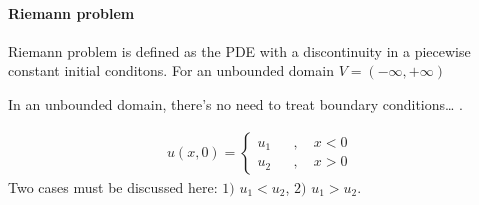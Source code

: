 \documentclass[letterpaper,10pt,english]{jupyterBook}
\begin{document}
\paragraph{Riemann problem}
\label{\detokenize{ch/pde/hyperbolic-1d-scalar-nonlinear:riemann-problem}}\label{\detokenize{ch/pde/hyperbolic-1d-scalar-nonlinear:pde-hyperbolic-problems-scalar-nonlinear-examples-burgers-riemann}}
\sphinxAtStartPar
Riemann problem is defined as the PDE with a discontinuity in a piecewise constant initial conditons. For an unbounded domain \(V = (-\infty, + \infty)\)%
\begin{footnote}[3]\sphinxAtStartFootnote
In an unbounded domain, there’s no need to treat boundary conditions… .
%
\end{footnote}
\begin{equation*}
\begin{split}u(x,0) = \left\{ \begin{aligned} u_1 && , \quad x < 0 \\ u_2 && , \quad x > 0\end{aligned} \right. \end{split}
\end{equation*}
\sphinxAtStartPar
Two cases must be discussed here: \(1)\) \(u_1 < u_2\), \(2)\) \(u_1 > u_2\).
\end{document}
